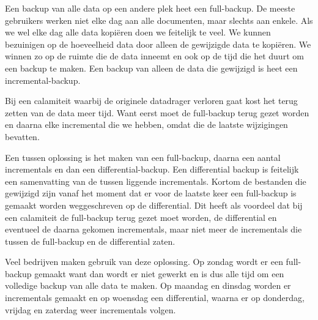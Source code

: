 Een backup van alle data op een andere plek heet een full-backup. De meeste gebruikers werken niet elke dag aan alle documenten, maar slechts aan enkele. Als we wel elke dag alle data kopi\"eren doen we feitelijk te veel. We kunnen bezuinigen op de hoeveelheid data door alleen de gewijzigde data te kopi\"eren. We winnen zo op de ruimte die de data inneemt en ook op de tijd die het duurt om een backup te maken. Een backup van alleen de data die gewijzigd is heet een incremental-backup.

Bij een calamiteit waarbij de originele datadrager verloren gaat kost het terug zetten van de data meer tijd. Want eerst moet de full-backup terug gezet worden en daarna elke incremental die we hebben, omdat die de laatste wijzigingen bevatten.

Een tussen oplossing is het maken van een full-backup, daarna een aantal incrementals en dan een differential-backup. Een differential backup is feitelijk een samenvatting van de tussen liggende incrementals. Kortom de bestanden die gewijzigd zijn vanaf het moment dat er voor de laatste keer een full-backup is gemaakt worden weggeschreven op de differential. Dit heeft als voordeel dat bij een calamiteit de full-backup terug gezet moet worden, de differential en eventueel de daarna gekomen incrementals, maar niet meer de incrementals die tussen de full-backup en de differential zaten.

Veel bedrijven maken gebruik van deze oplossing. Op zondag wordt er een full-backup gemaakt want dan wordt er niet gewerkt en is dus alle tijd om een volledige backup van alle data te maken. Op maandag en dinsdag worden er incrementals gemaakt en op woensdag een differential, waarna er op donderdag, vrijdag en zaterdag weer incrementals volgen.

